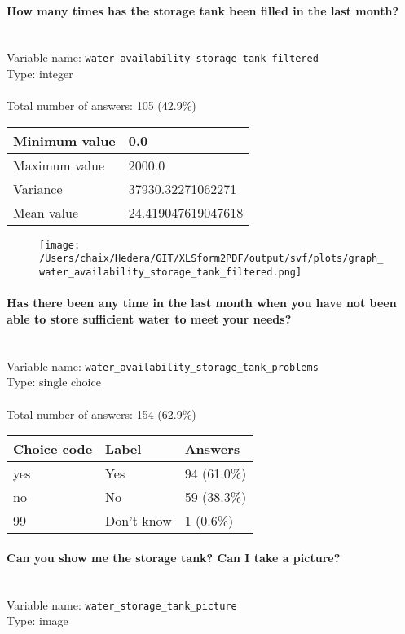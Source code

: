 \documentclass[11.5pt, a4paper]{scrartcl}
\begin{document}
\paragraph{How many times has the storage tank been filled in the last month? }
\  \\Variable name: \texttt{water\_availability\_storage\_tank\_filtered}\\
Type: integer\\
\\Total number of answers: 105 (42.9\%)
\\[0.2em] \begin{tabular}{p{4cm}|p{8cm}}
Minimum value &0.0 \\
\hline
\cellcolor{mygray} Maximum value & \cellcolor{mygray}2000.0 \\
\hline
Variance &37930.32271062271 \\
\hline
\cellcolor{mygray} Mean value & \cellcolor{mygray}24.419047619047618 \\
\hline
\end{tabular}
\begin{figure}[H]
\centering
\texttt{[image: /Users/chaix/Hedera/GIT/XLSform2PDF/output/svf/plots/graph\_water\_availability\_storage\_tank\_filtered.png]}
\end{figure}
\paragraph{Has there been any time in the last month when you have not been able to store sufficient water to meet your needs? }
\  \\Variable name: \texttt{water\_availability\_storage\_tank\_problems}\\
Type: single choice\\
\\Total number of answers: 154 (62.9\%)
\\[0.2em] \begin{tabular}{p{4cm}|p{8cm}|p{3cm}}
Choice code & Label & Answers \\
\hline
yes & Yes& \cellcolor{color3}94 (61.0\%)\\
\cellcolor{mygray} no & \cellcolor{mygray}No & \cellcolor{color1}59 (38.3\%)\\
99 & Don’t know& \cellcolor{color0}1 (0.6\%)\\
\end{tabular}
\paragraph{Can you show me the storage tank? Can I take a picture?}
\  \\Variable name: \texttt{water\_storage\_tank\_picture}\\
Type: image\\
\end{document}
